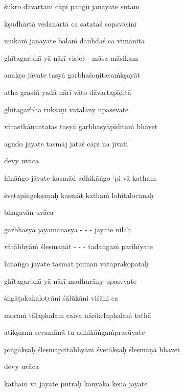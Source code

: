 śukro dāvartanī cāpi paṅgū janayate sutam \veg\dontdisplaylinenum

kṣudhārtā vedanārtā ca satataś copavāsinī\thinspace{\dandab} \dontdisplaylinenum

mūkaṁ janayate bālaṁ dauhdaś ca vimānitā \veg\dontdisplaylinenum

ghītagarbhā yā nārī visjet - māsa māsikam\thinspace{\dandab} \dontdisplaylinenum

anakṣo jāyate tasyā garbhaśoṇitasaṁkṣayāt \veg\dontdisplaylinenum

atha grastā yadā nārī vāto dāvartapīḍitā\thinspace{\dandab} \dontdisplaylinenum

ghītagarbhā rukṣāṇi vātalāny upasevate \veg\dontdisplaylinenum

vātasthānantatas tasyā garbhasyāpīḍitaṁ bhavet\thinspace{\dandab} \dontdisplaylinenum

agudo jāyate tasmāj jātaś cāpi na jīvati \veg\dontdisplaylinenum

devy uvāca~{\dandab}\dontdisplaylinenum 

hīnāṅgo jāyate kasmād adhikāṅgo 'pi vā katham\thinspace{\danda} \dontdisplaylinenum

śvetapiṅgekṣaṇaḥ kasmāt kathaṁ lohitalocanaḥ \veg\dontdisplaylinenum

bhagavān uvāca~{\dandab}\dontdisplaylinenum 

garbhasya jāyamānasya - - -  jāyate nilaḥ\thinspace{\danda} \dontdisplaylinenum

vātābhyāṁ śleṣmaṇāt - - - tadaṅgaṁ parihīyate \veg\dontdisplaylinenum

hīnāṅgo jāyate tasmāt pumān vātaprakopataḥ\thinspace{\dandab} \dontdisplaylinenum

ghītagarbhā yā nārī madhurāṇy upasevate \veg\dontdisplaylinenum

śṅgāṭakakalotyāni śālūkāni viśāni ca\thinspace{\dandab} \dontdisplaylinenum

mocaṁ tālaphalaṁ caiva nārikelaphalaṁ tathā \veg\dontdisplaylinenum

atikṣṇaṁ sevamānā tu adhikāṅgaṁprasūyate\thinspace{\dandab} \dontdisplaylinenum

piṅgākṣaḥ śleṣmapittābhyāṁ śvetākṣaḥ śleṣmaṇā bhavet \veg\dontdisplaylinenum

devy uvāca~{\dandab}\dontdisplaylinenum 

kathaṁ vā jāyate putraḥ kanyakā kena jāyate\thinspace{\danda} \dontdisplaylinenum


